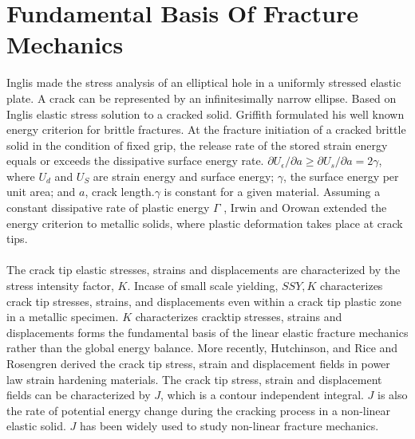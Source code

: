 \documentclass[12pt]{article}
\begin{document}
\section{Fundamental Basis Of Fracture Mechanics}
Inglis made the stress analysis of an elliptical hole in a uniformly stressed elastic plate. A crack can be 
represented by an infinitesimally narrow ellipse. Based on Inglis elastic stress solution to a cracked solid. 
Griffith formulated his well known energy criterion for brittle fractures. At the fracture initiation of a cracked brittle solid in the 
condition of fixed grip, the release rate of the stored strain energy equals or exceeds the dissipative surface energy rate.
\(\partial U_\epsilon / \partial a \geq \partial U_s / \partial a = 2 \gamma \), 
where $U_d$ and $U_S$ are strain energy and surface energy; $\gamma$,  the surface energy per unit area; and $a$, crack length.$\gamma$ 
is constant for a given material. Assuming a constant dissipative rate of plastic energy $\Gamma $ , 
Irwin and Orowan extended the energy criterion to metallic solids, where plastic deformation takes place at crack tips.
\\\\The crack tip elastic stresses, strains and displacements are characterized by the stress intensity factor, $K$.  
Incase of small scale yielding, $SSY, K$ characterizes crack tip stresses, strains, and displacements even within a 
crack tip plastic zone in a metallic specimen. $K$ characterizes cracktip
stresses, strains and displacements forms the fundamental basis of the linear elastic fracture mechanics rather than 
the global energy balance. More recently, Hutchinson, and Rice and Rosengren derived the crack tip stress, strain and 
displacement fields in power law strain hardening 
materials. The crack tip stress, strain and displacement 
fields can be characterized by $J$, which is a contour independent 
integral. $J$ is also the rate of potential energy change during 
the cracking process in a non-linear elastic solid. $J$ has been 
widely used to study non-linear fracture mechanics.
\end{document}
